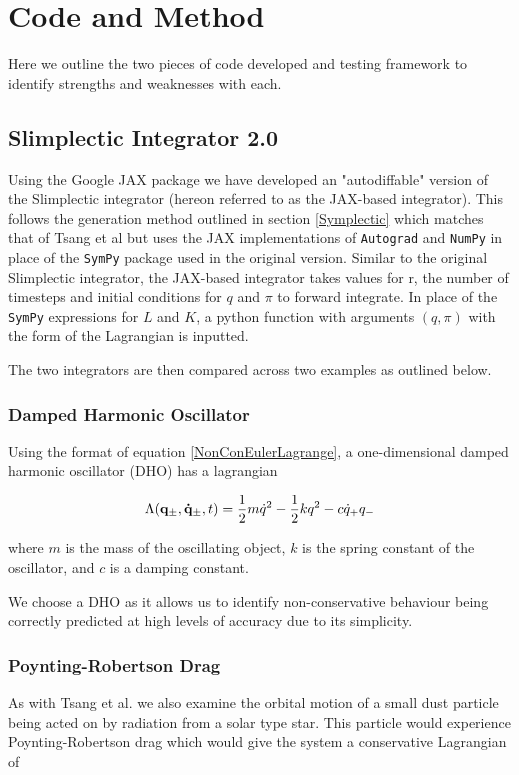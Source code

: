 \documentclass[10pt]{iopart}
\begin{document}
\section{Code and Method}
Here we outline the two pieces of code developed and testing framework to identify strengths and weaknesses with each. 

\subsection{Slimplectic Integrator 2.0}
Using the Google JAX package we have developed an "autodiffable" version of the Slimplectic integrator (hereon referred to as the JAX-based integrator). This follows the generation method outlined in section \ref{Symplectic} which matches that of Tsang et al \cite{Tsang_Slimplectic} but uses the JAX implementations of \texttt{Autograd} and \texttt{NumPy} in place of the \texttt{SymPy} package used in the original version. Similar to the original Slimplectic integrator, the JAX-based integrator takes values for r, the number of timesteps and initial conditions for $q$ and $\pi$ to forward integrate. In place of the \texttt{SymPy} expressions for $L$ and $K$, a python function with arguments $(q,\pi)$ with the form of the Lagrangian is inputted. 

The two integrators are then compared across two examples as outlined below.

\subsubsection{Damped Harmonic Oscillator \\}
Using the format of equation \ref{NonConEulerLagrange}, a one-dimensional damped harmonic oscillator (DHO) has a lagrangian

\begin{equation}
\label{DHOeqn}
	\Lambda(\bold{q_{\pm},\dot{q}_{\pm}},t) = \frac{1}{2}m\dot{q}^2 - \frac{1}{2}kq^2 - c\dot{q}_+q_-
\end{equation}

where $m$ is the mass of the oscillating object, $k$ is the spring constant of the oscillator, and $c$ is a damping constant.  

We choose a DHO as it allows us to identify non-conservative behaviour being correctly predicted at high levels of accuracy due to its simplicity. 

\subsubsection{Poynting-Robertson Drag \\}
As with Tsang et al. \cite{Tsang_Slimplectic} we also examine the orbital motion of a small dust particle being acted on by radiation from a solar type star. This particle would experience Poynting-Robertson drag \cite{Poynting-Robertson} which would give the system a conservative Lagrangian of 
\end{document}
